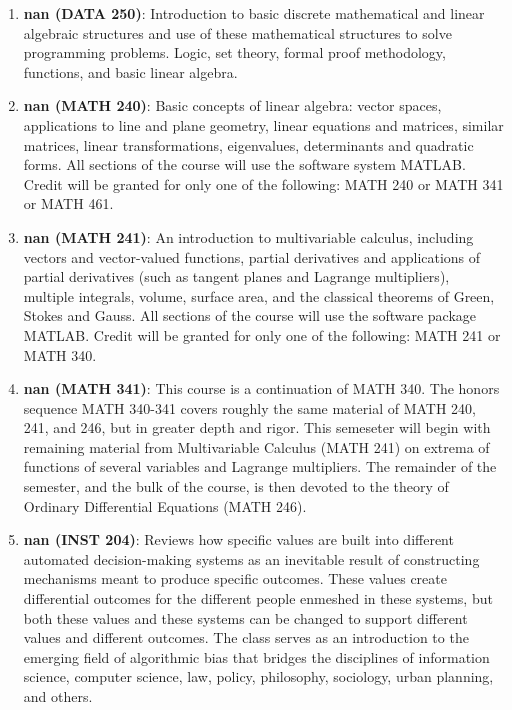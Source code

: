 \begin{enumerate}
\item \textbf{nan (DATA 250)}:  Introduction to basic discrete mathematical and linear algebraic structures and use of these mathematical structures to solve programming problems. Logic, set theory, formal proof methodology, functions, and basic linear algebra.
\item \textbf{nan (MATH 240)}: Basic concepts of linear algebra: vector spaces, applications to line and plane geometry, linear equations and matrices, similar matrices, linear transformations, eigenvalues, determinants and quadratic forms. All sections of the course will use the software system MATLAB. Credit will be granted for only one of the following: MATH 240 or MATH 341 or MATH 461.
\item \textbf{nan (MATH 241)}: An introduction to multivariable calculus, including vectors and vector-valued functions, partial derivatives and applications of partial derivatives (such as tangent planes and Lagrange multipliers), multiple integrals, volume, surface area, and the classical theorems of Green, Stokes and Gauss. All sections of the course will use the software package MATLAB. Credit will be granted for only one of the following: MATH 241 or MATH 340.
\item \textbf{nan (MATH 341)}: This course is a continuation of MATH 340. The honors sequence MATH 340-341 covers roughly the same material of MATH 240, 241, and 246, but in greater depth and rigor. This semeseter will begin with remaining material from Multivariable Calculus (MATH 241) on extrema of functions of several variables and Lagrange multipliers. The remainder of the semester, and the bulk of the course, is then devoted to the theory of Ordinary Differential Equations (MATH 246).
\item \textbf{nan (INST 204)}: Reviews how specific values are built into different automated decision-making systems as an inevitable result of constructing mechanisms meant to produce specific outcomes. These values create differential outcomes for the different people enmeshed in these systems, but both these values and these systems can be changed to support different values and different outcomes. The class serves as an introduction to the emerging field of algorithmic bias that bridges the disciplines of information science, computer science, law, policy, philosophy, sociology, urban planning, and others.

\end{enumerate}
